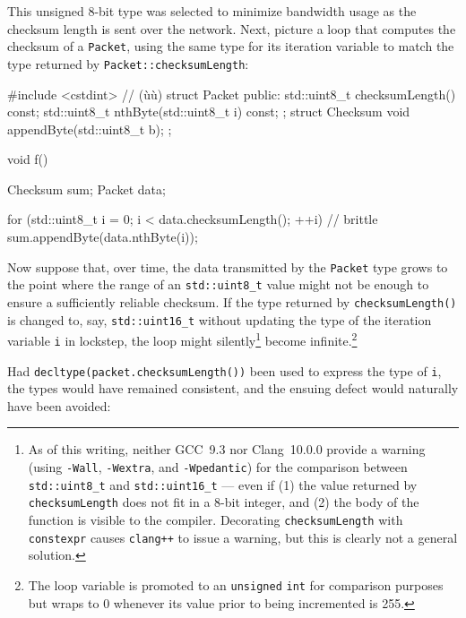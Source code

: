 \noindent This unsigned 8-bit type was selected to minimize bandwidth usage
as the checksum length is sent over the network. Next, picture a loop
that computes the checksum of a \lstinline!Packet!, using the same type for its iteration variable to match the
type returned by \lstinline!Packet::checksumLength!:

\begin{emcppshiddenlisting}[emcppsbatch=e7]
#include <cstdint>  // (ù{}ù)
struct Packet
{
public:
    std::uint8_t checksumLength() const;
    std::uint8_t nthByte(std::uint8_t i) const;
};
struct Checksum {
    void appendByte(std::uint8_t b);
};
\end{emcppshiddenlisting}
\begin{emcppslisting}[emcppsbatch=e7]
void f()
{
    Checksum sum;
    Packet data;

    for (std::uint8_t i = 0; i < data.checksumLength(); ++i)  // brittle
    {
        sum.appendByte(data.nthByte(i));
    }
}
\end{emcppslisting}


Now suppose that, over time, the data transmitted by the \lstinline!Packet!
type grows to the point where the range of an \lstinline!std::uint8_t!
value might not be enough to ensure a sufficiently reliable checksum. If
the type returned by \lstinline!checksumLength()! is changed to, say,
\lstinline!std::uint16_t! without updating the type of the iteration
variable \lstinline!i! in lockstep, the loop might
silently{\cprotect\footnote{As of this writing, neither
GCC~9.3 nor Clang~10.0.0 provide
a warning (using \lstinline!-Wall!, \lstinline!-Wextra!, and
\lstinline!-Wpedantic!) for the comparison between \lstinline!std::uint8_t!
and \lstinline!std::uint16_t! --- even if (1) the value returned by
\lstinline!checksumLength! does not fit in a 8-bit integer, and (2) the
body of the function is visible to the compiler. Decorating
\lstinline!checksumLength! with \lstinline!constexpr! causes
\lstinline!clang++! to issue a warning, but this is clearly not a general
solution.}} become infinite.{\cprotect\footnote{The loop
variable is promoted to an \lstinline!unsigned! \lstinline!int! for
comparison purposes but wraps to 0 whenever its value prior to
  being incremented is 255.}}

Had \lstinline!decltype(packet.checksumLength())! been used to express the
type of \lstinline!i!, the types would have remained consistent, and the
ensuing defect would naturally have been avoided:

